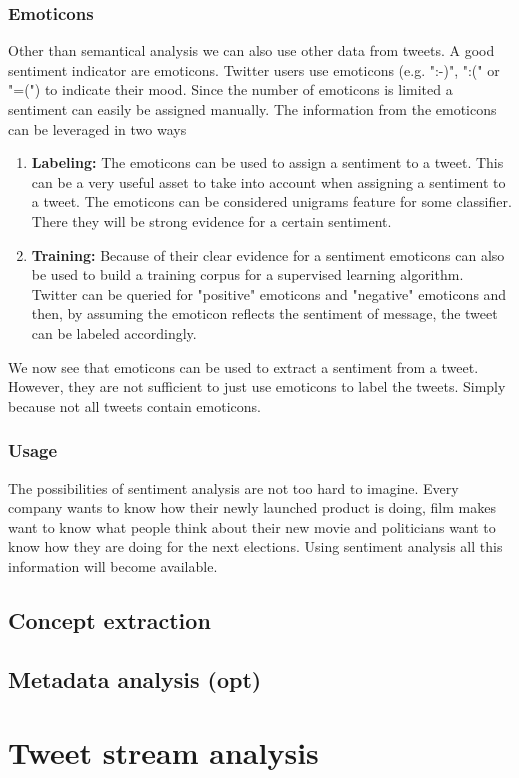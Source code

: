 \documentclass{article}
\begin{document}
\subsubsection{Emoticons}
Other than semantical analysis we can also use other data from tweets. A good sentiment indicator are emoticons. Twitter users use emoticons (e.g. ":-)", ":(" or "=(") to indicate their mood.\cite{twitterSentiment} Since the number of emoticons is limited a sentiment can easily be assigned manually. The information from the emoticons can be leveraged in two ways
\begin{enumerate}
\item \textbf{Labeling:} The emoticons can be used to assign a sentiment to a tweet. This can be a very useful asset to take into account when assigning a sentiment to a tweet. The emoticons can be considered unigrams feature for some classifier. There they will be strong evidence for a certain sentiment.
\item \textbf{Training:} Because of their clear evidence for a sentiment emoticons can also be used to build a training corpus for a supervised learning algorithm. Twitter can be queried for "positive" emoticons and "negative" emoticons and then, by assuming the emoticon reflects the sentiment of message, the tweet can be labeled accordingly.\cite{moodLens} 
\end{enumerate}
We now see that emoticons can be used to extract a sentiment from a tweet. However, they are not sufficient to just use emoticons to label the tweets. Simply because not all tweets contain emoticons.
\subsubsection{Usage}
The possibilities of sentiment analysis are not too hard to imagine. Every company wants to know how their newly launched product is doing, film makes want to know what people think about their new movie and politicians want to know how they are doing for the next elections. Using sentiment analysis all this information will become available\cite{machineLearning}. 
\subsection{Concept extraction}
\subsection{Metadata analysis (opt)}

\section{Tweet stream analysis}
\end{document}
